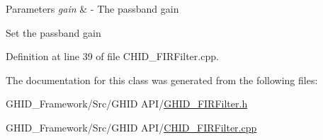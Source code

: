 \begin{DoxyParams}{\-Parameters}
{\em gain} & -\/ \-The passband gain \\
\hline
\end{DoxyParams}
\-Set the passband gain 

\-Definition at line 39 of file \-C\-H\-I\-D\-\_\-\-F\-I\-R\-Filter.\-cpp.



\-The documentation for this class was generated from the following files\-:\begin{DoxyCompactItemize}
\item 
\-G\-H\-I\-D\-\_\-\-Framework/\-Src/\-G\-H\-I\-D A\-P\-I/\hyperlink{_g_h_i_d___f_i_r_filter_8h}{\-G\-H\-I\-D\-\_\-\-F\-I\-R\-Filter.\-h}\item 
\-G\-H\-I\-D\-\_\-\-Framework/\-Src/\-G\-H\-I\-D A\-P\-I/\hyperlink{_c_h_i_d___f_i_r_filter_8cpp}{\-C\-H\-I\-D\-\_\-\-F\-I\-R\-Filter.\-cpp}\end{DoxyCompactItemize}

